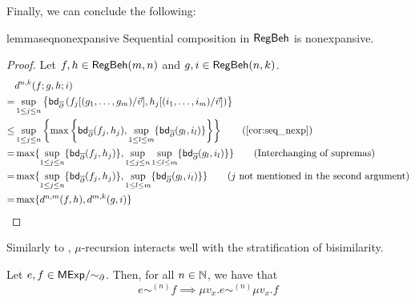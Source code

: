 Finally, we can conclude the following:
\begin{restatable}{lemma}{seqnonexpansive}\label{lem:seq_nonexpansive}
	Sequential composition in $\mathsf{RegBeh}$ is nonexpansive.
\end{restatable}
\begin{proof}
	Let $f,h \in \mathsf{RegBeh}(m,n)$ and $g,i \in \mathsf{RegBeh}(n,k)$. 
	\begin{align*}
		&d^{n,k}(f ;g, h;i)\\
		=& \sup_{1 \leq j \leq n} \left\{ \mathsf{bd}_{\overline\partial} \left(  f_j[(g_1, \dots, g_m)/\vec{v}], h_j[(i_1, \dots, i_m)/\vec{v}] \right)\right\}\\
		\leq & \sup_{1 \leq j \leq n} \left\{\max \left\{\mathsf{bd}_{\overline\partial} (f_j,h_j), \sup_{ 1 \leq l \leq m} \{\mathsf{bd}_{\overline\partial} (g_l, i_l)\}\right\}\right\} \tag{\Cref{cor:seq_nexp}} \\
		=  & \max \{ \sup_{1 \leq j \leq n} \{\mathsf{bd}_{\overline\partial} (f_j,h_j)\}, \sup_{1 \leq j \leq n} \sup_{ 1 \leq l \leq m} \{\mathsf{bd}_{\overline\partial} (g_l, i_l)\}\}  \tag{Interchanging of supremas} \\
		= & \max \{ \sup_{1 \leq j \leq n} \{\mathsf{bd}_{\overline\partial} (f_j,h_j)\}, \sup_{ 1 \leq l \leq m} \{\mathsf{bd}_{\overline\partial} (g_l, i_l)\}\}  \tag{$j$ not mentioned in the second argument}\\
		= & \max \{d^{n,m}(f,h), d^{m,k}(g,i)\} \tag*{\hfill\qedhere}
	\end{align*}
\end{proof}
Similarly to , $\mu$-recursion interacts well with the stratification of bisimilarity.
\begin{lemma}\label{lem:rec_startified_bisim}
	Let $e, f \in {\mathsf{MExp}}/{\sim_{\partial}}$. Then, for all $n \in \mathbb{N}$, we have that
	$$
	e \sim^{(n)} f \implies \mu v_x. e \sim^{(n)} \mu v_x.f
	$$
\end{lemma}
